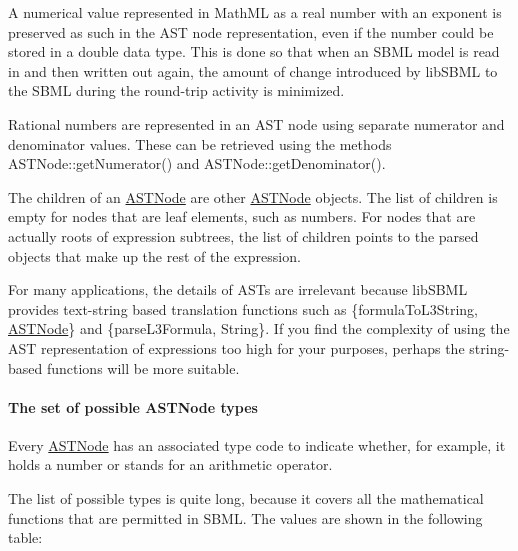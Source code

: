 \begin{DoxyItemize}
\item A numerical value represented in Math\+ML as a real number with an exponent is preserved as such in the A\+ST node representation, even if the number could be stored in a {\ttfamily double} data type. This is done so that when an S\+B\+ML model is read in and then written out again, the amount of change introduced by lib\+S\+B\+ML to the S\+B\+ML during the round-\/trip activity is minimized.\end{DoxyItemize}
\begin{DoxyItemize}
\item Rational numbers are represented in an A\+ST node using separate numerator and denominator values. These can be retrieved using the methods A\+S\+T\+Node\+::get\+Numerator() and A\+S\+T\+Node\+::get\+Denominator().\end{DoxyItemize}
\begin{DoxyItemize}
\item The children of an \hyperlink{class_a_s_t_node}{A\+S\+T\+Node} are other \hyperlink{class_a_s_t_node}{A\+S\+T\+Node} objects. The list of children is empty for nodes that are leaf elements, such as numbers. For nodes that are actually roots of expression subtrees, the list of children points to the parsed objects that make up the rest of the expression.\end{DoxyItemize}
For many applications, the details of A\+S\+Ts are irrelevant because lib\+S\+B\+ML provides text-\/string based translation functions such as \{formula\+To\+L3\+String, \hyperlink{class_a_s_t_node}{A\+S\+T\+Node}\} and \{parse\+L3\+Formula, String\}. If you find the complexity of using the A\+ST representation of expressions too high for your purposes, perhaps the string-\/based functions will be more suitable.

\paragraph*{\label{_ASTNodeType_t}%
The set of possible A\+S\+T\+Node types}

\begin{DoxyParagraph}{}
Every \hyperlink{class_a_s_t_node}{A\+S\+T\+Node} has an associated type code to indicate whether, for example, it holds a number or stands for an arithmetic operator.
\end{DoxyParagraph}
The list of possible types is quite long, because it covers all the mathematical functions that are permitted in S\+B\+ML. The values are shown in the following table\+:




